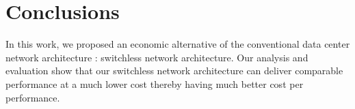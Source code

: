 \vspace{-0.1in}
\section{Conclusions}
\label{sec:conclusion}
In this work, we proposed an economic alternative of the conventional data center network architecture : switchless network architecture. Our analysis and evaluation show that our switchless network architecture can deliver comparable performance at a much lower cost thereby having much better cost per performance. 
